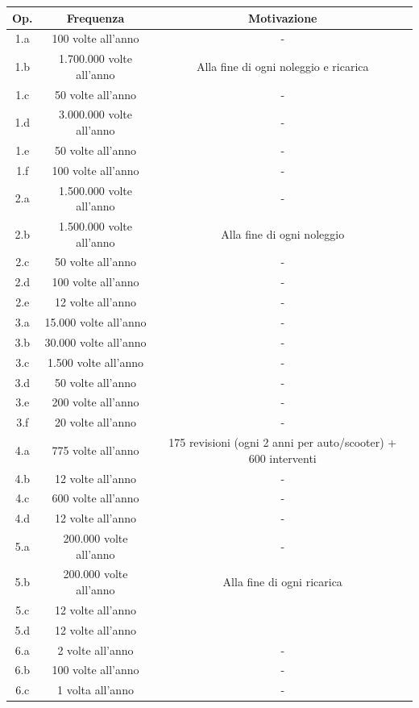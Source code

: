 \documentclass{article}
\begin{document}
\begin{table}[H]
    \centering
    \begin{tabular}{|c|c|c|}
        \hline
        Op. & Frequenza & Motivazione \\
        \hline
        1.a & 100 volte all'anno & - \\
        1.b & 1.700.000 volte all'anno & Alla fine di ogni noleggio e ricarica \\
        1.c & 50 volte all'anno & - \\
        1.d & 3.000.000 volte all'anno & - \\
        1.e & 50 volte all'anno & - \\
        1.f & 100 volte all'anno & - \\
        2.a & 1.500.000 volte all'anno & - \\
        2.b & 1.500.000 volte all'anno & Alla fine di ogni noleggio \\
        2.c & 50 volte all'anno & - \\
        2.d & 100 volte all'anno & - \\
        2.e & 12 volte all'anno & - \\
        3.a & 15.000 volte all'anno & - \\
        3.b & 30.000 volte all'anno & - \\
        3.c & 1.500 volte all'anno & - \\
        3.d & 50 volte all'anno & - \\
        3.e & 200 volte all'anno & - \\
        3.f & 20 volte all'anno & - \\
        4.a & 775 volte all'anno & 175 revisioni (ogni 2 anni per auto/scooter) + 600 interventi \\
        4.b & 12 volte all'anno & - \\
        4.c & 600 volte all'anno  & - \\
        4.d & 12 volte all'anno & - \\
        5.a & 200.000 volte all'anno & - \\
        5.b & 200.000 volte all'anno & Alla fine di ogni ricarica \\
        5.c & 12 volte all'anno &  \\
        5.d & 12 volte all'anno &  \\
        6.a & 2 volte all'anno & - \\
        6.b & 100 volte all'anno & - \\
        6.c & 1 volta all'anno & - \\

\end{tabular}
\end{table}
\end{document}

